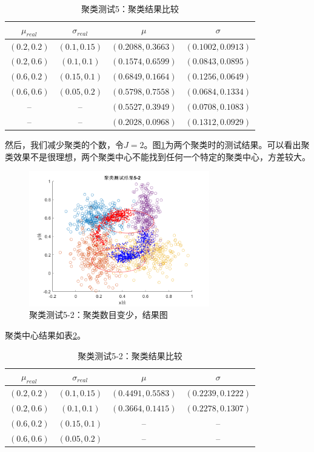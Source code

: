 \begin{table}[htbp]
\centering
\begin{tabular}{c|c||c|c}
  \hline
  $\mu_{real}$   &  $\sigma_{real}$ &  $\mu$  &   $\sigma$\\
  \hline
  $(0.2,0.2)$    &  $(0.1,0.15)$   &  $(0.2088, 0.3663)$  & $(0.1002, 0.0913)$ \\
  $(0.2,0.6)$    &  $(0.1,0.1)$   &  $(0.1574, 0.6599)$  & $(0.0843, 0.0895)$ \\
  $(0.6,0.2)$    &  $(0.15,0.1)$   &  $(0.6849, 0.1664)$  & $(0.1256, 0.0649)$ \\
  $(0.6,0.6)$    &  $(0.05,0.2)$   &  $(0.5798, 0.7558)$  & $(0.0684, 0.1334)$ \\
  --    &  --   &  $(0.5527, 0.3949)$  & $(0.0708, 0.1083)$ \\
  --    &  --   &  $(0.2028, 0.0968)$  & $(0.1312, 0.0929)$ \\
  \hline
\end{tabular}
\caption{聚类测试5：聚类结果比较}
\label{tab:clustest5}
\end{table}

然后，我们减少聚类的个数，令$J = 2$。图\ref{fig:clustest5-2re}为两个聚类时的测试结果。可以看出聚类效果不是很理想，两个聚类中心不能找到任何一个特定的聚类中心，方差较大。
\begin{figure}[htbp]
   \centering
   \includegraphics[width=0.7\textwidth]{ClusterTest52Result.png} %
   \caption{聚类测试5-2：聚类数目变少，结果图}
   \label{fig:clustest5-2re}
\end{figure}

聚类中心结果如表\ref{tab:clustest5-2}。

\begin{table}[htbp]
\centering
\begin{tabular}{c|c||c|c}
  \hline
  $\mu_{real}$   &  $\sigma_{real}$ &  $\mu$  &   $\sigma$\\
  \hline
  $(0.2,0.2)$    &  $(0.1,0.15)$   &  $(0.4491, 0.5583)$  & $(0.2239, 0.1222)$ \\
  $(0.2,0.6)$    &  $(0.1,0.1)$   &  $(0.3664, 0.1415)$  & $(0.2278, 0.1307)$ \\
  $(0.6,0.2)$    &  $(0.15,0.1)$   &  --  & -- \\
  $(0.6,0.6)$    &  $(0.05,0.2)$   &  --  & -- \\
  \hline
\end{tabular}
\caption{聚类测试5-2：聚类结果比较}
\label{tab:clustest5-2}
\end{table}

